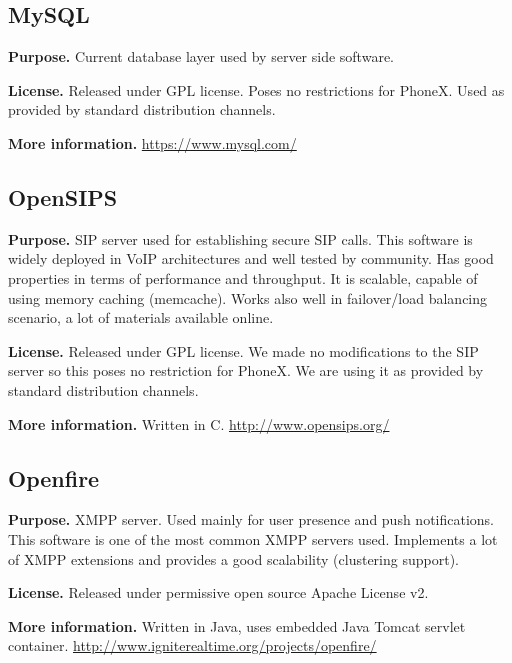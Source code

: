 \documentclass[a4paper,10pt]{article}
\begin{document}
\subsection{MySQL}
\par\smallskip\noindent\textbf{Purpose.} Current database layer used by server side software. 
\par\smallskip\noindent\textbf{License.} Released under GPL license. Poses no restrictions for PhoneX.
Used as provided by standard distribution channels.
\par\smallskip\noindent\textbf{More information.} \url{https://www.mysql.com/}

\subsection{OpenSIPS}
\par\smallskip\noindent\textbf{Purpose.} SIP server used for establishing secure SIP calls. This software is widely deployed in VoIP architectures 
and well tested by community. Has good properties in terms of performance and throughput. It is scalable, capable of using memory caching (memcache).
Works also well in failover/load balancing scenario, a lot of materials available online. 

\par\smallskip\noindent\textbf{License.} Released under GPL license. We made no modifications to the SIP server so this poses no restriction for PhoneX.
We are using it as provided by standard distribution channels.
\par\smallskip\noindent\textbf{More information.} Written in C. \url{http://www.opensips.org/}

\subsection{Openfire}
\par\smallskip\noindent\textbf{Purpose.} XMPP server. Used mainly for user presence and push notifications. 
This software is one of the most common XMPP servers used. Implements a lot of XMPP extensions and provides a good scalability (clustering support).

\par\smallskip\noindent\textbf{License.} Released under permissive open source Apache License v2.
\par\smallskip\noindent\textbf{More information.}  Written in Java, uses embedded Java Tomcat servlet container. \url{http://www.igniterealtime.org/projects/openfire/}
\end{document}
